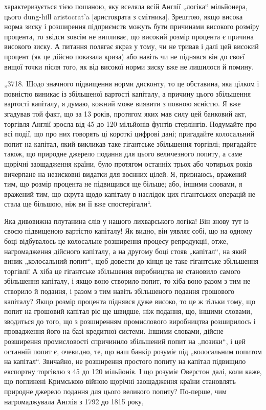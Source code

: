 \parcont{}  %
характеризується тією пошаною, яку вселяла всій Англії „логіка“
мільйонера, цього dung-hill aristocrat’a [аристократа з смітника].
Зрештою, якщо висока норма зиску і розширення підприємств
можуть бути причинами високого розміру процента, то звідси
зовсім не випливає, що високий розмір процента є причина високого зиску. А питання полягає якраз у
тому, чи не тривав і далі
цей високий процент (як це дійсно показала криза) або навіть чи не піднявся він до своєї вищої точки
після того, як від
високої норми зиску вже не лишилося й помину.

„3718. Щодо значного підвищення норми дисконту, то це
обставина, яка цілком і повністю виникає із збільшеної вартості капіталу, а причину цього збільшення
вартості капіталу, я думаю, кожний може виявити з повною ясністю. Я вже згадував
той факт, що за 13 років, протягом яких мав силу цей банковий акт, торгівля Англії зросла від 45 до
120 мільйонів фунтів
стерлінгів. Подумайте про всі події, що про них говорять ці короткі цифрові дані; пригадайте
колосальний попит на капітал,
який викликав таке гігантське збільшення торгівлі; пригадайте
також, що природне джерело подання для цього величезного попиту, а саме щорічні заощадження країни,
було протягом останніх трьох або чотирьох років вичерпане на незисковні видатки
для воєнних цілей. Я, признаюсь, вражений тим, що розмір процента не підвищився ще більше; або,
іншими словами, я вражений тим, що скрута щодо капіталу в наслідок цих гігантських
операцій не стала ще більшою, ніж ви її вже спостерігали“.

Яка дивовижна плутанина слів у нашого лихварського логіка!
Він знову тут із своєю підвищеною вартістю капіталу! Як видно,
він уявляє собі, що на одному боці відбувалось це колосальне
розширення процесу репродукції, отже, нагромадження дійсного
капіталу, а на другому боці стояв „капітал“, на який виник
„колосальний попит“, щоб довести до кінця це таке гігантське
збільшення торгівлі! А хіба це гігантське збільшення виробництва
не становило самого збільшення капіталу, і якщо воно створило
попит, то хіба воно разом з тим не створило й подання, і разом
з тим навіть збільшеного подання грошового капіталу? Якщо
розмір процента піднявся дуже високо, то це ж тільки тому,
що попит на грошовий капітал ріс ще швидше, ніж подання,
що, іншими словами, зводиться до того, що з розширенням промислового виробництва розширилось і
провадження його на
базі кредитної системи. Іншими словами, дійсне розширення
промисловості спричинило збільшений попит на „позики“, і цей
останній попит є, очевидно, те, що наш банкір розуміє під „колосальним попитом на капітал“.
Звичайно, не розширення простого попиту на капітал підвищило експортну торгівлю з 45 до
120 мільйонів. І що розуміє Оверстон далі, коли каже, що
поглинені Кримською війною щорічні заощадження країни становлять природне джерело подання для цього
великого попиту? По-перше, чим нагромаджувала Англія з 1792 до 1815 року,
\parbreak{}  %
